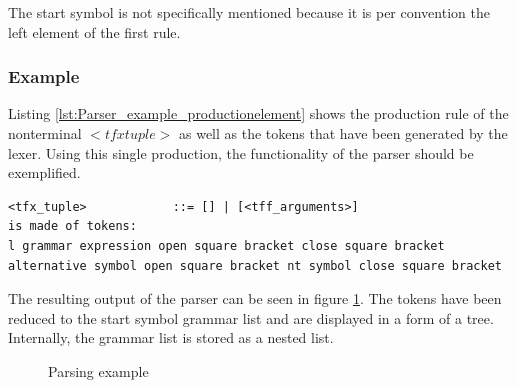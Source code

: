 The start symbol is not specifically mentioned because it is per convention the left element of the first rule.

\subsubsection{Example}
Listing \ref{lst:Parser_example_productionelement} shows the production rule of the nonterminal $<tfx tuple>$ as well as the tokens that have been generated by the lexer. Using this single production, the functionality of the parser should be exemplified. \\

\begin{lstlisting}[basicstyle=\scriptsize	,caption= Production element,label= lst:Parser_example_productionelement]
<tfx_tuple>            ::= [] | [<tff_arguments>]
is made of tokens:
l grammar expression open square bracket close square bracket alternative symbol open square bracket nt symbol close square bracket
\end{lstlisting}

The resulting output of the parser can be seen in figure \ref{fig:ImplementationParsing}. The tokens have been reduced to the start symbol grammar list and are displayed in a form of a tree. Internally, the grammar list is stored as a nested list.

\begin{figure}[H]
\caption{Parsing example}
\label{fig:ImplementationParsing}
\end{figure}
                
